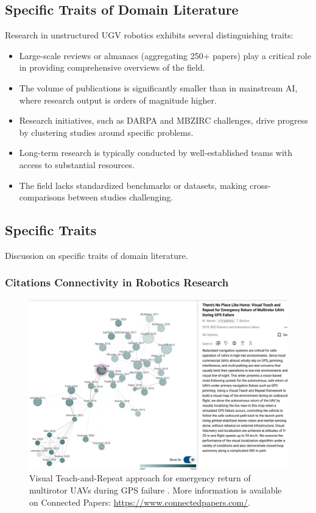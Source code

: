 \documentclass[runningheads]{llncs}
\begin{document}
\subsection{Specific Traits of Domain Literature}
Research in unstructured UGV robotics exhibits several distinguishing traits:
\begin{itemize}
  \item Large-scale reviews or almanacs (aggregating 250+ papers) play a critical role in providing comprehensive overviews of the field.
  \item The volume of publications is significantly smaller than in mainstream AI, where research output is orders of magnitude higher.
  \item Research initiatives, such as DARPA and MBZIRC challenges, drive progress by clustering studies around specific problems.
  \item Long-term research is typically conducted by well-established teams with access to substantial resources.
  \item The field lacks standardized benchmarks or datasets, making cross-comparisons between studies challenging.
\end{itemize}

\subsection{Specific Traits}
Discussion on specific traits of domain literature.

\subsubsection{Citations Connectivity in Robotics Research}

\begin{figure}[ht]
  \centering
  \includegraphics[width=\linewidth]{img/There_is_no_place_like_home_research_tree.png}
  \caption{Visual Teach-and-Repeat approach for emergency return of multirotor UAVs during GPS failure \cite{warren-ral19-no-place-like-Home}. More information is available on Connected Papers: \protect\url{https://www.connectedpapers.com/}.}
  \label{fig:no_place_like_home}
\end{figure}
\end{document}
